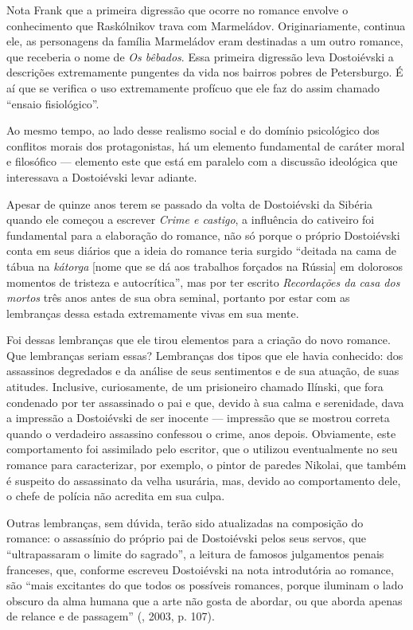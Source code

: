 Nota Frank que a primeira digressão que ocorre no romance envolve o
conhecimento que Raskólnikov trava com Marmeládov. Originariamente,
continua ele, as personagens da família Marmeládov eram destinadas a um
outro romance, que receberia o nome de \emph{Os bêbados}. Essa primeira
digressão leva Dostoiévski a descrições extremamente pungentes da vida
nos bairros pobres de Petersburgo. É aí que se verifica o uso
extremamente profícuo que ele faz do assim chamado ``ensaio
fisiológico''.

Ao mesmo tempo, ao lado desse realismo social e do domínio psicológico
dos conflitos morais dos protagonistas, há um elemento fundamental de
caráter moral e filosófico --- elemento este que está em paralelo com a
discussão ideológica que interessava a Dostoiévski levar adiante.

Apesar de quinze anos terem se passado da volta de Dostoiévski da
Sibéria quando ele começou a escrever \emph{Crime e castigo}, a
influência do cativeiro foi fundamental para a elaboração do romance,
não só porque o próprio Dostoiévski conta em seus diários que a ideia do
romance teria surgido ``deitada na cama de tábua na \emph{kátorga}
[nome que se dá aos trabalhos forçados na Rússia] em dolorosos
momentos de tristeza e autocrítica'', mas por ter escrito
\emph{Recordações da casa dos mortos} três anos antes de sua obra
seminal, portanto por estar com as lembranças dessa estada extremamente
vivas em sua mente.

Foi dessas lembranças que ele tirou elementos para a criação do novo
romance. Que lembranças seriam essas? Lembranças dos tipos que ele havia
conhecido: dos assassinos degredados e da análise de seus sentimentos e
de sua atuação, de suas atitudes. Inclusive, curiosamente, de um
prisioneiro chamado Ilínski, que fora condenado por ter assassinado o
pai e que, devido à sua calma e serenidade, dava a impressão a
Dostoiévski de ser inocente --- impressão que se mostrou correta quando o
verdadeiro assassino confessou o crime, anos depois. Obviamente, este
comportamento foi assimilado pelo escritor, que o utilizou eventualmente
no seu romance para caracterizar, por exemplo, o pintor de paredes
Nikolai, que também é suspeito do assassinato da velha usurária, mas,
devido ao comportamento dele, o chefe de polícia não acredita em sua
culpa.

Outras lembranças, sem dúvida, terão sido atualizadas na composição do
romance: o assassínio do próprio pai de Dostoiévski pelos seus servos,
que ``ultrapassaram o limite do sagrado'', a leitura de famosos
julgamentos penais franceses, que, conforme escreveu Dostoiévski na nota
introdutória ao romance, são ``mais excitantes do que todos os possíveis
romances, porque iluminam o lado obscuro da alma humana que a arte não
gosta de abordar, ou que aborda apenas de relance e de passagem'' (, 2003, p. 107).

